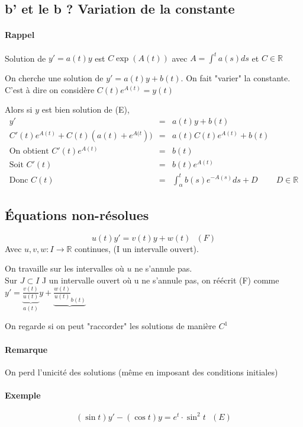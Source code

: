 \subsection{b' et le b ? Variation de la constante}

\paragraph{Rappel} Solution de $y'=a(t)y$ est $C\exp({A(t)})$ avec $A = \int^t a(s)ds$ et $C \in \mathbb{R}$

On cherche une solution de $y'=a(t)y+b(t)$. On fait "varier" la constante. C'est à dire on considère $C(t)e^{A(t)}=y(t)$

Alors si $y$ est bien solution de (E), \[\begin{array}{rclr}
y'&=&a(t)y + b(t) \\
C'(t)e^{A(t)} + C(t)(a(t)+e^{A(t})) &=& a(t)C(t)e^{A(t)} + b(t) \\
\text{On obtient } C'(t)e^{A(t)} &=& b(t) \\
\text{Soit } C'(t)&=& b(t)e^{A(t)} \\
\text{Donc } C(t) &=& \int^t_\alpha b(s)e^{-A(s)} ds + D & D \in \mathbb{R} \end{array}\]

\subsection{Équations non-résolues}

\[u(t)y' = v(t)y+w(t) \text{ } (F)\] Avec $u, v, w : I \rightarrow \mathbb{R}$ continues, (I un intervalle ouvert).

On travaille sur les intervalles où $u$ ne s'annule pas. ~\\
Sur $J \subset I$ J un intervalle ouvert où u ne s'annule pas, on réécrit (F) comme $y' = \underbrace{\frac{v(t)}{u(t)}}_{a(t)}y + \underbrace{\frac{w(t)}{u(t)}_{b(t)}} $

On regarde si on peut "raccorder" les solutions de manière $C^1$

\paragraph{Remarque} On perd l'unicité des solutions (même en imposant des conditions initiales)

\paragraph{Exemple} \[(\sin t)y' - (\cos t)y = e^t\cdot\sin^2t \text{ } (E)\]

